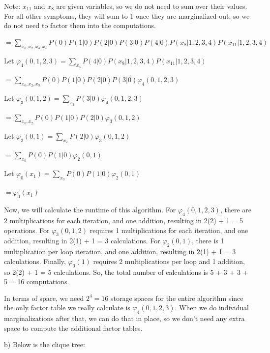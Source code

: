 \documentclass[12pt]{article}
\begin{document}
Note: $x_{11}$ and $x_8$ are given variables, so we do not need to sum over their values. For all other symptoms, they will sum to 1 once they are marginalized out, so we do not need to factor them into the computations.

$= \sum_{x_0, x_2, x_3, x_4} P(0)P(1 \vert 0)P(2 \vert 0)P(3 \vert 0)P(4 \vert 0)P(x_8 \vert 1, 2, 3, 4)P(x_{11} \vert 1, 2, 3, 4)$

Let $\varphi_4(0, 1, 2, 3) = \sum_{x_4} P(4 \vert 0)P(x_8 \vert 1, 2, 3, 4)P(x_{11} \vert 1, 2, 3, 4)$

$= \sum_{x_0, x_2, x_3} P(0)P(1 \vert 0)P(2 \vert 0)P(3 \vert 0)\varphi_4(0, 1, 2, 3)$

Let $\varphi_3(0, 1, 2) = \sum_{x_3} P(3 \vert 0)\varphi_4(0, 1, 2, 3)$

$= \sum_{x_0, x_2} P(0)P(1 \vert 0)P(2 \vert 0)\varphi_3(0, 1, 2)$

Let $\varphi_2(0, 1) = \sum_{x_2} P(2 \vert 0)\varphi_3(0, 1, 2)$

$= \sum_{x_0} P(0)P(1 \vert 0)\varphi_2(0, 1)$

Let $\varphi_0(x_1) = \sum_{x_0} P(0)P(1 \vert 0)\varphi_2(0, 1)$

$= \varphi_0(x_1)$

Now, we will calculate the runtime of this algorithm. For $\varphi_4(0, 1, 2, 3)$, there are 2 multiplications for each iteration, and one addition, resulting in 2(2) + 1 = 5 operations. For $\varphi_3(0, 1, 2)$ requires 1 multiplications for each iteration, and one addition, resulting in 2(1) + 1 = 3 calculations. For $\varphi_2(0, 1)$, there is 1 multiplication per loop iteration, and one addition, resulting in 2(1) + 1 = 3 calculations. Finally, $\varphi_0(1)$ requires 2 multiplications per loop and 1 addition, so 2(2) + 1 = 5 calculations. So, the total number of calculations is 5 + 3 + 3 + 5 = 16 computations.

In terms of space, we need $2^4 = 16$ storage spaces for the entire algorithm since the only factor table we really calculate is $\varphi_4(0, 1, 2, 3)$. When we do individual marginalizations after that, we can do that in place, so we don't need any extra space to compute the additional factor tables.

b) Below is the clique tree:
\end{document}
